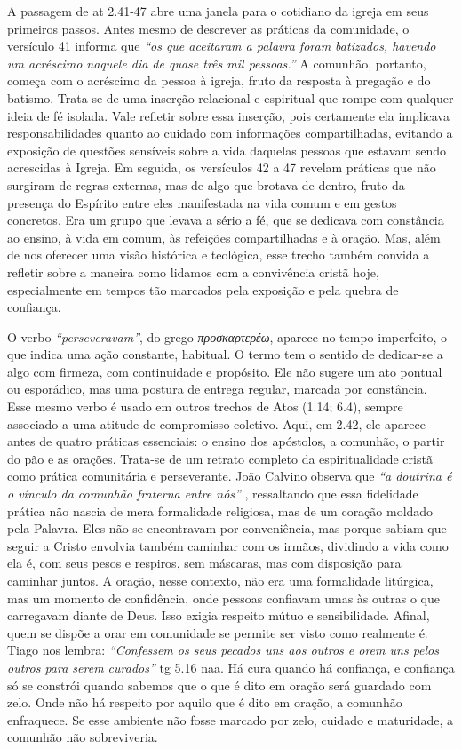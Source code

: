 A passagem de \gls{at} 2.41-47 abre uma janela para o cotidiano da igreja em seus primeiros passos. Antes mesmo de descrever as práticas da comunidade, o versículo 41 informa que \textit{``os que aceitaram a palavra foram batizados, havendo um acréscimo naquele dia de quase três mil pessoas.''} A comunhão, portanto, começa com o acréscimo da pessoa à igreja, fruto da resposta à pregação e do batismo. Trata-se de uma inserção relacional e espiritual que rompe com qualquer ideia de fé isolada. Vale refletir sobre essa inserção, pois certamente ela implicava responsabilidades quanto ao cuidado com informações compartilhadas, evitando a exposição de questões sensíveis sobre a vida daquelas pessoas que estavam sendo acrescidas à Igreja. Em seguida, os versículos 42 a 47 revelam práticas que não surgiram de regras externas, mas de algo que brotava de dentro, fruto da presença do Espírito entre eles manifestada na vida comum e em gestos concretos. Era um grupo que levava a sério a fé, que se dedicava com constância ao ensino, à vida em comum, às refeições compartilhadas e à oração. Mas, além de nos oferecer uma visão histórica e teológica, esse trecho também convida a refletir sobre a maneira como lidamos com a convivência cristã hoje, especialmente em tempos tão marcados pela exposição e pela quebra de confiança.

O verbo \textit{``perseveravam''}, do grego \textit{\foreignlanguage{greek}{προσκαρτερέω}}, aparece no tempo imperfeito, o que indica uma ação constante, habitual. O termo tem o sentido de dedicar-se a algo com firmeza, com continuidade e propósito. Ele não sugere um ato pontual ou esporádico, mas uma postura de entrega regular, marcada por constância. Esse mesmo verbo é usado em outros trechos de Atos (1.14; 6.4), sempre associado a uma atitude de compromisso coletivo. Aqui, em 2.42, ele aparece antes de quatro práticas essenciais: o ensino dos apóstolos, a comunhão, o partir do pão e as orações. Trata-se de um retrato completo da espiritualidade cristã como prática comunitária e perseverante. João Calvino observa que \textit{``a doutrina é o vínculo da comunhão fraterna entre nós''} \cite{calvinoAtos2}, ressaltando que essa fidelidade prática não nascia de mera formalidade religiosa, mas de um coração moldado pela Palavra. Eles não se encontravam por conveniência, mas porque sabiam que seguir a Cristo envolvia também caminhar com os irmãos, dividindo a vida como ela é, com seus pesos e respiros, sem máscaras, mas com disposição para caminhar juntos. A oração, nesse contexto, não era uma formalidade litúrgica, mas um momento de confidência, onde pessoas confiavam umas às outras o que carregavam diante de Deus. Isso exigia respeito mútuo e sensibilidade. Afinal, quem se dispõe a orar em comunidade se permite ser visto como realmente é. Tiago nos lembra: \textit{``Confessem os seus pecados uns aos outros e orem uns pelos outros para serem curados''} \gls{tg} 5.16 \gls{naa}. Há cura quando há confiança, e confiança só se constrói quando sabemos que o que é dito em oração será guardado com zelo. Onde não há respeito por aquilo que é dito em oração, a comunhão enfraquece. Se esse ambiente não fosse marcado por zelo, cuidado e maturidade, a comunhão não sobreviveria.

